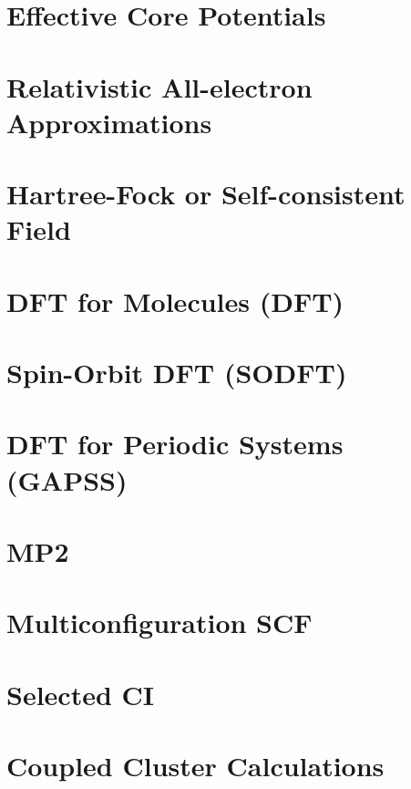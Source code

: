 \chapter{Effective Core Potentials}


\chapter{Relativistic All-electron Approximations}


\chapter{Hartree-Fock or Self-consistent Field} 


\chapter{DFT for Molecules (DFT)}


\chapter{Spin-Orbit DFT (SODFT)}


\chapter{DFT for Periodic Systems (GAPSS)}


\chapter{MP2}


\chapter{Multiconfiguration SCF}


\chapter{Selected CI}


\chapter{Coupled Cluster Calculations}


%


